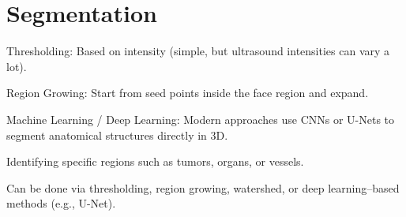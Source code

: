 \chapter{Segmentation}


Thresholding: Based on intensity (simple, but ultrasound intensities can vary a lot).

Region Growing: Start from seed points inside the face region and expand.

Machine Learning / Deep Learning: Modern approaches use CNNs or U-Nets to segment anatomical structures directly in 3D.

Identifying specific regions such as tumors, organs, or vessels.

Can be done via thresholding, region growing, watershed, or deep learning–based methods (e.g., U-Net).